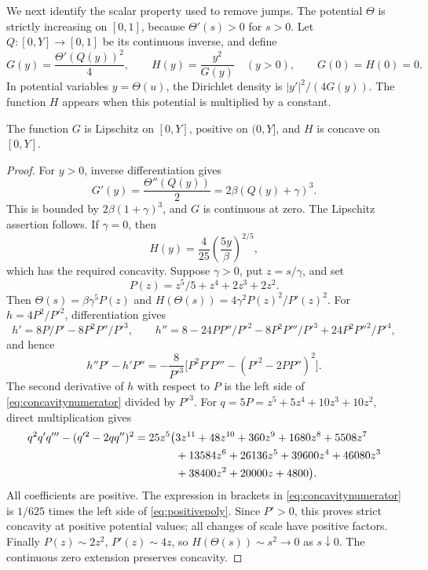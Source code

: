 We next identify the scalar property used to remove jumps. The potential
\(\Theta\) is strictly increasing on \([0,1]\), because
\(\Theta'(s)>0\) for \(s>0\). Let \(Q:[0,Y]\to[0,1]\) be its continuous
inverse, and define
\begin{equation}\label{eq:GH}
 G(y)=\frac{\Theta'(Q(y))^2}{4},\qquad
 H(y)=\frac{y^2}{G(y)}\quad(y>0),\qquad G(0)=H(0)=0.
\end{equation}
In potential variables \(y=\Theta(u)\), the Dirichlet density is
\(|y'|^2/(4G(y))\). The function \(H\) appears when this potential
is multiplied by a constant.

\begin{lemma}\label{lem:concavity}
The function \(G\) is Lipschitz on \([0,Y]\), positive on \((0,Y]\),
and \(H\) is concave on \([0,Y]\).
\end{lemma}

\begin{proof}
For \(y>0\), inverse differentiation gives
\[
 G'(y)=\frac{\Theta''(Q(y))}{2}
       =2\beta(Q(y)+\gamma)^3.
\]
This is bounded by \(2\beta(1+\gamma)^3\), and \(G\) is continuous at
zero. The Lipschitz assertion follows.
If \(\gamma=0\), then
\[
 H(y)=\frac4{25}\left(\frac{5y}{\beta}\right)^{2/5},
\]
which has the required concavity. Suppose \(\gamma>0\), put \(z=s/\gamma\),
and set
\[
 P(z)=z^5/5+z^4+2z^3+2z^2.
\]
Then \(\Theta(s)=\beta\gamma^5P(z)\) and
\(H(\Theta(s))=4\gamma^2P(z)^2/P'(z)^2\).
For \(h=4P^2/P'^2\), differentiation gives
\[
 h'=8P/P'-8P^2P''/P'^3,\qquad
 h''=8-24PP''/P'^2-8P^2P'''/P'^3+24P^2P''^2/P'^4,
\]
and hence
\begin{equation}\label{eq:concavitynumerator}
 h''P'-h'P''=-\frac{8}{P'^3}
          \bigl[P^2P'P'''-(P'^2-2PP'')^2\bigr].
\end{equation}
The second derivative of \(h\) with respect to \(P\) is the left
side of \eqref{eq:concavitynumerator} divided by \(P'^3\).
For \(q=5P=z^5+5z^4+10z^3+10z^2\), direct multiplication gives
\begin{align}
 q^2q'q'''-(q'^2-2qq'')^2
 =25z^5\bigl(&3z^{11}+48z^{10}+360z^9+1680z^8+5508z^7 \notag\\
 &+13584z^6+26136z^5+39600z^4+46080z^3 \notag\\
 &+38400z^2+20000z+4800\bigr). \label{eq:positivepoly}
\end{align}
All coefficients are positive. The expression in brackets in
\eqref{eq:concavitynumerator} is \(1/625\) times the left side of
\eqref{eq:positivepoly}. Since \(P'>0\), this proves strict concavity
at positive potential values; all changes of scale have positive factors.
Finally \(P(z)\sim2z^2\), \(P'(z)\sim4z\), so
\(H(\Theta(s))\sim s^2\to0\) as \(s\downarrow0\).
The continuous zero extension preserves concavity.
\end{proof}

